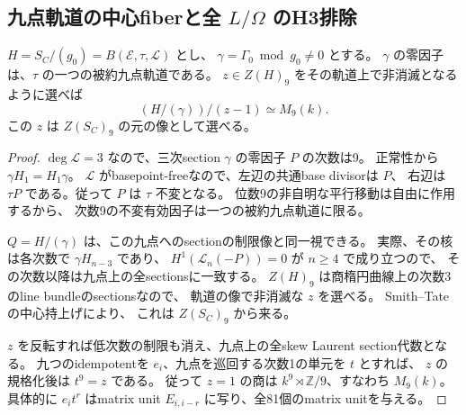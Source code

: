 \subsection{九点軌道の中心fiberと全 $L/\Omega$ のH3排除}
\label{subsec:cubic-third-root-unit-boundary-L-orbit-exclusion}
\begin{lemma}[正常三次の九点軌道]
\label{lem:cubic-third-root-unit-boundary-L-nine-orbit}
$H=S_C/(g_0)=B(\mathcal E,\tau,\mathcal L)$ とし、
$\gamma=\Gamma_0\bmod g_0\ne0$ とする。
$\gamma$ の零因子は、$\tau$ の一つの被約九点軌道である。
$z\in Z(H)_9$ をその軌道上で非消滅となるように選べば
\[
 (H/(\gamma))/(z-1)\simeq M_9(k).
\]
この $z$ は $Z(S_C)_9$ の元の像として選べる。
\end{lemma}
\begin{proof}
$\deg\mathcal L=3$ なので、三次section $\gamma$ の零因子 $P$ の次数は9。
正常性から $\gamma H_1=H_1\gamma$。
$\mathcal L$ がbasepoint-freeなので、左辺の共通base divisorは $P$、
右辺は $\tau P$ である。従って $P$ は $\tau$ 不変となる。
位数9の非自明な平行移動は自由に作用するから、
次数9の不変有効因子は一つの被約九点軌道に限る。

$Q=H/(\gamma)$ は、この九点へのsectionの制限像と同一視できる。
実際、その核は各次数で $\gamma H_{n-3}$ であり、
$H^1(\mathcal L_n(-P))=0$ が $n\ge4$ で成り立つので、
その次数以降は九点上の全sectionsに一致する。
$Z(H)_9$ は商楕円曲線上の次数3のline bundleのsectionsなので、
軌道の像で非消滅な $z$ を選べる。
Smith--Tate\cite[Theorem~3.7 and its proof]{SmithTateCenters}の中心持上げにより、
これは $Z(S_C)_9$ から来る。

$z$ を反転すれば低次数の制限も消え、九点上の全skew Laurent section代数となる。
九つのidempotentを $e_i$、九点を巡回する次数1の単元を $t$ とすれば、
$z$ の規格化後は $t^9=z$ である。
従って $z=1$ の商は $k^9\rtimes\mathbb Z/9$、すなわち $M_9(k)$。
具体的に $e_i t^r$ はmatrix unit $E_{i,i-r}$ に写り、全81個のmatrix unitを与える。
\end{proof}

